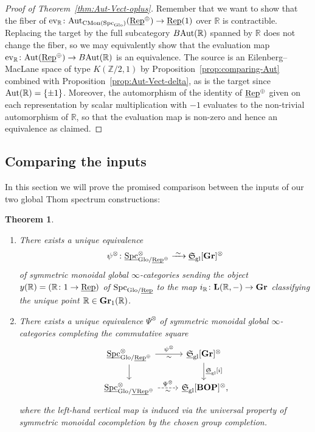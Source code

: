 \documentclass[reqno]{memo-l}
\theoremstyle{mythm}
\newtheorem{thm}{Theorem}[section]
\theoremstyle{definition}
\numberwithin{equation}{section}
\newcommand{\R} {{\mathbb{R}}}
\newcommand{\Z} {{\mathbb{Z}}}
\newcommand{\gl}{\textup{gl}}
\DeclareMathOperator{\ev}{ev}
\DeclareMathOperator{\Spc}{Spc}
\DeclareMathOperator{\CMon}{CMon}
\newcommand{\cat}[1]{\textbf{\textup{#1}}}
\newcommand{\Glo}{\textup{Glo}}
\newcommand{\Aut}{\textup{Aut}}
\newcommand{\ulhelper}[2]{\underline{\setbox0=\hbox{$#1#2$}\dp0=0.4pt \box0\relax}}
\newcommand{\ul}[1]{{\mathpalette\ulhelper{#1}}\hbox{\rule[-2pt]{0pt}{0pt}}}
\newcommand{\iso}{\xrightarrow{\;\smash{\raisebox{-0.25ex}{\ensuremath{\scriptstyle\sim}}}\;}}
\newcommand{\myS}{{{\mathfrak S\kern-.4pt}}}
\newcommand{\VRep}{\textup{VRep}}
\newcommand{\Vect}{\textup{Rep}}
\begin{document}
\begin{proof}[Proof of Theorem~\ref{thm:Aut-Vect-oplus}]
    Remember that we want to show that the fiber of $\ev_{\R}\colon\Aut_{\CMon(\Spc_{\Glo})}(\ul\Vect^\oplus)\to\ul\Vect(1)$ over $\R$ is contractible. Replacing the target by the full subcategory $B\Aut(\R)$ spanned by $\R$ does not change the fiber, so we may equivalently show that the evaluation map $\ev_{\R}\colon\Aut(\ul\Vect^\oplus)\to B\Aut(\R)$ is an equivalence. The source is an Eilenberg--MacLane space of type $K(\Z/2,1)$ by Proposition~\ref{prop:comparing-Aut} combined with Proposition~\ref{prop:Aut-Vect-delta}, as is the target since $\Aut(\R)=\{\pm1\}$. Moreover, the automorphism of the identity of $\ul\Vect^\oplus$ given on each representation by scalar multiplication with $-1$ evaluates to the non-trivial automorphism of $\R$, so that the evaluation map is non-zero and hence an equivalence as claimed.
\end{proof}

\subsection{Comparing the inputs} In this section we will prove the promised comparison between the inputs of our two global Thom spectrum constructions:

\begin{thm}\label{thm:comparing-inputs}
    \begin{enumerate}
        \item There exists a unique equivalence 
        \[
            \psi^\otimes\colon\ul\Spc_{\Glo/\ul\Vect^\oplus}^\otimes\iso
            \ul\myS_\gl[\cat{Gr}]^\otimes
        \] of symmetric monoidal global $\infty$-categories 
        sending the object $y(\R)=(\R\colon 1\to\ul\Vect)$ of $\Spc_{\Glo/\ul\Vect}$ to the map $i_{\R}\colon\cat{L}(\R,-)\to\cat{Gr}$ classifying the unique point $\R\in\cat{Gr}_1(\R)$. 
        \item There exists a unique equivalence $\Psi^\otimes$ of symmetric monoidal global $\infty$-categories completing the commutative square
        \begin{equation}\label{diag:defining-Psi-otimes}
            \begin{tikzcd}
                \ul\Spc_{\Glo/\ul\Vect^\oplus}^\otimes\arrow[r,"\psi^\otimes","\sim"']\arrow[d] & \ul\myS_{\gl}[\cat{Gr}]^\otimes\arrow[d,"{\ul\myS_\gl[i]}"]\\
                \ul\Spc_{\Glo/\ul\VRep^{\oplus}}^\otimes\arrow[r,dashed,"\Psi^\otimes","\sim"'] & \ul\myS_\gl[\cat{BOP}]^\otimes\rlap,
            \end{tikzcd}
        \end{equation}
        where the left-hand vertical map is induced via the universal property of symmetric monoidal cocompletion by the chosen group completion.
    \end{enumerate}
\end{thm}
\end{document}
